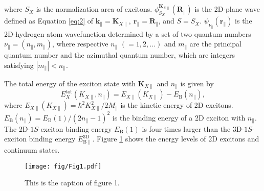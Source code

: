 %
where $S_X$ is the normalization area of excitons.
%
$\phi_{S_X}^{\bm{K}_{X\parallel}}(\bm{R}_{\parallel})$ is the 2D-plane wave defined as Equation \eqref{eq:2}
of $\bm{k}_{\parallel} = \bm{K}_{X\parallel},\ \bm{r}_{\parallel} = \bm{R}_{\parallel}$, and $S = S_X$.
%
$\psi_{\nu_{\parallel}}(\bm{r}_{\parallel})$ is the 2D-hydrogen-atom wavefunction
determined by a set of two quantum numbers $\nu_{\parallel} = (n_{\parallel}, m_{\parallel})$,
\textsuperscript{\cite{35-Shinada-JPSJ-1966,36-Yang-PRA-1991,37-Parfitt-JMP-2002}}
where respective $n_{\parallel}$ $(= 1, 2, \dots)$ and $m_{\parallel}$ are
the principal quantum number and the azimuthal quantum number,
which are integers satisfying $|m_{\parallel}| < n_{\parallel}$.
%

%
The total energy of the exciton state with $\bm{K}_{X\parallel}$ and $n_{\parallel}$ is given by
%
\begin{equation}
    E_X^{\mathrm{tot}}(K_{X\parallel}, n_{\parallel})
    = E_{X\parallel}(K_{X\parallel}) - E_{\mathrm{B}}(n_{\parallel}),
\end{equation}
%
where $E_{X\parallel}(K_{X\parallel}) = \hbar^2 K_{X\parallel}^2 / 2M_{\parallel}$ is the kinetic energy of 2D excitons.
%
$E_{\mathrm{B}}(n_{\parallel}) = E_{\mathrm{B}}(1) / ( 2 n_{\parallel} - 1 )^2$
is the binding energy of a 2D exciton with $n_{\parallel}$.
%
The 2D-$1S$-exciton binding energy $E_{\mathrm{B}}(1)$ is
four times larger than the 3D-$1S$-exciton binding energy $E_{\mathrm{B}\parallel}^{\mathrm{3D}}$.
%
Figure \ref{fig:1} shows the energy levels of 2D excitons and continuum states.
%



%
\begin{figure}[t]
    \texttt{[image: fig/Fig1.pdf]}
    \caption{
        This is the caption of figure 1.
    }
    \label{fig:1}
\end{figure}
%

